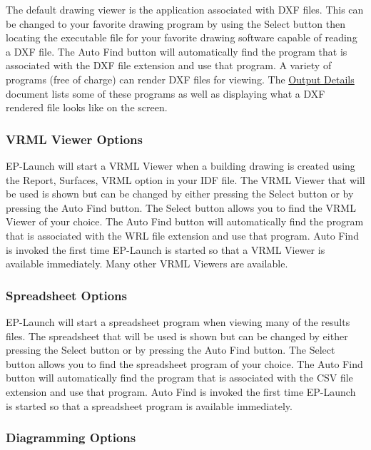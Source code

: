 The default drawing viewer is the application associated with DXF files. This can be changed to your favorite drawing program by using the Select button then locating the executable file for your favorite drawing software capable of reading a DXF file. The Auto Find button will automatically find the program that is associated with the DXF file extension and use that program. A variety of programs (free of charge) can render DXF files for viewing. The \href{file:///E:/Docs4PDFs/OutputDetailsAndExamples.pdf}{Output Details} document lists some of these programs as well as displaying what a DXF rendered file looks like on the screen.

\subsubsection{VRML Viewer Options}\label{vrml-viewer-options}

EP-Launch will start a VRML Viewer when a building drawing is created using the Report, Surfaces, VRML option in your IDF file. The VRML Viewer that will be used is shown but can be changed by either pressing the Select button or by pressing the Auto Find button. The Select button allows you to find the VRML Viewer of your choice. The Auto Find button will automatically find the program that is associated with the WRL file extension and use that program. Auto Find is invoked the first time EP-Launch is started so that a VRML Viewer is available immediately. Many other VRML Viewers are available.

\subsubsection{Spreadsheet Options}\label{spreadsheet-options}

EP-Launch will start a spreadsheet program when viewing many of the results files. The spreadsheet that will be used is shown but can be changed by either pressing the Select button or by pressing the Auto Find button. The Select button allows you to find the spreadsheet program of your choice. The Auto Find button will automatically find the program that is associated with the CSV file extension and use that program. Auto Find is invoked the first time EP-Launch is started so that a spreadsheet program is available immediately.

\subsubsection{Diagramming Options}\label{diagramming-options}

